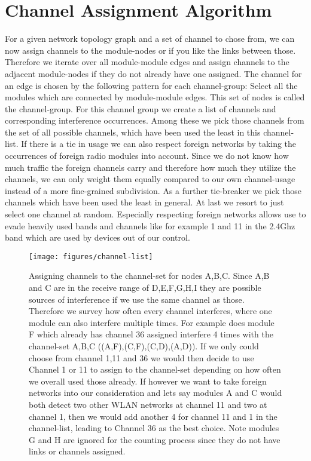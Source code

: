 \section{Channel Assignment Algorithm}
  For a given network topology graph and a set of channel to chose from, we can now assign channels to the module-nodes or if you like the links
  between those. Therefore we iterate over all module-module edges and assign channels to the adjacent module-nodes if they do not already have one assigned.
  The channel for an edge is chosen by the following pattern for each channel-group:
  Select all the modules which are connected by module-module edges. This set of nodes is called the channel-group.
  For this channel group we create a list of channels and corresponding interference occurrences.
  Among these we pick those channels from the set of all possible channels, which have been used the least in this channel-list. If there is a tie in usage
  we can also respect foreign networks by taking the occurrences of foreign radio modules into account. Since we do not know how much traffic the foreign 
  channels carry and therefore how much they utilize the channels, we can only weight them equally compared to our own channel-usage instead of a more fine-grained subdivision.
  As a further tie-breaker we pick those channels which have been used the least in general.
  At last we resort to just select one channel at random.
  Especially respecting foreign networks allows use to evade heavily used
  bands and channels like for example 1 and 11 in the 2.4Ghz band which are used by devices out of our control.
  \begin{figure}[h]
    \centering
    \texttt{[image: figures/channel-list]}
    \caption{Assigning channels to the channel-set for nodes A,B,C. Since A,B and C are in the receive range of D,E,F,G,H,I they are possible sources
    of interference if we use the same channel as those. Therefore we survey how often every channel interferes, where one module can also interfere multiple times.
    For example does module F which already has channel 36 assigned interfere 4 times with the channel-set A,B,C ((A,F),(C,F),(C,D),(A,D)). If we only could choose from 
    channel 1,11 and 36 we would then decide to use Channel 1 or 11 to assign to the channel-set depending on how often we overall used those already.
    If however we want to take foreign networks into our consideration and lets say modules A and C would both detect two other \ac{WLAN} networks at channel 11 and two
    at channel 1, then we would add another 4 for channel 11 and 1 in the channel-list, leading to Channel 36 as the best choice. Note modules G and H are ignored 
    for the counting process since they do not have links or channels assigned.}
    \label{fig:channel-list}
  \end{figure}
  

